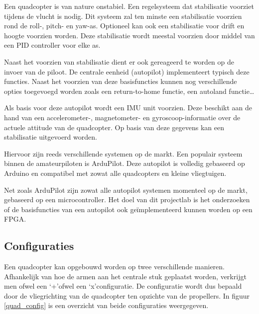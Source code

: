 			\par Een quadcopter is van nature onstabiel. Een regelsysteem dat stabilisatie voorziet tijdens de vlucht is nodig. Dit systeem zal ten minste een stabilisatie voorzien rond de roll-, pitch- en yaw-as. Optioneel kan ook een stabilisatie voor drift en hoogte voorzien worden. Deze stabilisatie wordt meestal voorzien door middel van een PID controller voor elke as.

			\par Naast het voorzien van stabilisatie dient er ook gereageerd te worden op de invoer van de piloot. De centrale eenheid (autopilot) implementeert typisch deze functies. Naast het voorzien van deze basisfuncties kunnen nog verschillende opties toegevoegd worden zoals een return-to-home functie, een autoland functie\ldots 

			\par Als basis voor deze autopilot wordt een IMU unit voorzien. Deze beschikt aan de hand van een accelerometer-, magnetometer- en gyroscoop-informatie over de actuele attitude van de quadcopter. Op basis van deze gegevens kan een stabilisatie uitgevoerd worden.

			\par Hiervoor zijn reeds verschillende systemen op de markt. Een populair systeem binnen de amateurpiloten is ArduPilot. Deze autopilot is volledig gebaseerd op Arduino en compatibel met zowat alle quadcopters en kleine vliegtuigen. 

			\par Net zoals ArduPilot zijn zowat alle autopilot systemen momenteel op de markt, gebaseerd op een microcontroller. Het doel van dit projectlab is het onderzoeken of de basisfuncties van een autopilot ook ge\"implementeerd kunnen worden op een FPGA.

		\subsection{Configuraties}

			\par Een quadcopter kan opgebouwd worden op twee verschillende manieren. Afhankelijk van hoe de armen aan het centrale stuk geplaatst worden, verkrijgt men ofwel een \textquoteleft+\textquoteright  ofwel een \textquoteleft x\textquoteright  configuratie. De configuratie wordt dus bepaald door de vliegrichting van de quadcopter ten opzichte van de propellers. In figuur \ref{quad_config} is een overzicht van beide configuraties weergegeven.

